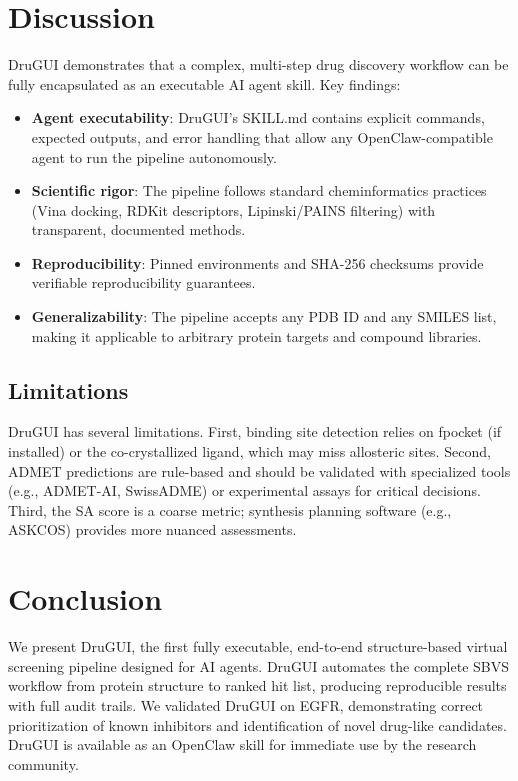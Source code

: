 \documentclass[10pt,oneside]{article}
\begin{document}
\section{Discussion}

DruGUI demonstrates that a complex, multi-step drug discovery workflow can be fully encapsulated as an executable AI agent skill. Key findings:

\begin{itemize}
    \item \textbf{Agent executability}: DruGUI's SKILL.md contains explicit commands, expected outputs, and error handling that allow any OpenClaw-compatible agent to run the pipeline autonomously.
    \item \textbf{Scientific rigor}: The pipeline follows standard cheminformatics practices (Vina docking, RDKit descriptors, Lipinski/PAINS filtering) with transparent, documented methods.
    \item \textbf{Reproducibility}: Pinned environments and SHA-256 checksums provide verifiable reproducibility guarantees.
    \item \textbf{Generalizability}: The pipeline accepts any PDB ID and any SMILES list, making it applicable to arbitrary protein targets and compound libraries.
\end{itemize}

\subsection{Limitations}

DruGUI has several limitations. First, binding site detection relies on fpocket (if installed) or the co-crystallized ligand, which may miss allosteric sites. Second, ADMET predictions are rule-based and should be validated with specialized tools (e.g., ADMET-AI, SwissADME) or experimental assays for critical decisions. Third, the SA score is a coarse metric; synthesis planning software (e.g., ASKCOS) provides more nuanced assessments.

\section{Conclusion}

We present DruGUI, the first fully executable, end-to-end structure-based virtual screening pipeline designed for AI agents. DruGUI automates the complete SBVS workflow from protein structure to ranked hit list, producing reproducible results with full audit trails. We validated DruGUI on EGFR, demonstrating correct prioritization of known inhibitors and identification of novel drug-like candidates. DruGUI is available as an OpenClaw skill for immediate use by the research community.



\end{document}
